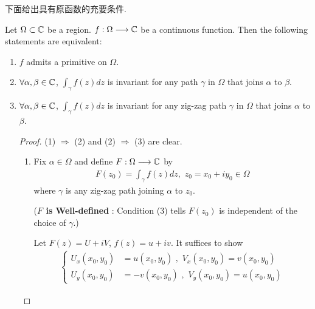 	\vspace{2em}
	下面给出具有原函数的充要条件.
	\begin{thm}
		Let $\Omega \subset \mathbb{C}$ be a region. $f : \Omega \longrightarrow \mathbb{C}$ be a continuous function. Then the following statements are equivalent:
		\begin{enumerate}
			\item[(1)]$f$ admits a primitive on $\Omega$.
			
			\item[(2)]$\forall \alpha , \beta \in \mathbb{C}$, $\int_{\gamma}{f(z) dz}$ is invariant for any path $\gamma$ in $\Omega$ that joins $\alpha$ to $\beta$.
			
			\item[(3)]$\forall \alpha , \beta \in \mathbb{C}$, $\int_{\gamma}{f(z) dz}$ is invariant for any zig-zag path $\gamma$ in $\Omega$ that joins $\alpha$ to $\beta$.
			
			\vspace{2em}
			\begin{proof}
				(1) $\Rightarrow$ (2) and (2) $\Rightarrow$ (3) are clear.
				\begin{enumerate}
					\item[(3) $\Rightarrow$ (1):]Fix $\alpha \in \Omega$ and define $F : \Omega \longrightarrow \mathbb{C}$ by 
					\begin{align}
						F(z_0) = \int_{\gamma}{f(z) dz} , \,\, z_0 = x_0 + i y_0 \in \Omega
					\end{align}
					where $\gamma$ is any zig-zag path joining $\alpha$ to $z_0$.
					\begin{center}
						(\textbf{$F$ is Well-defined} : Condition (3) tells $F(z_0)$ is independent of the choice of $\gamma$.)
					\end{center}
					
					\vspace{1.5em}
					Let $F(z) = U + i V$, $f(z) = u + i v$. It suffices to show
					\begin{align}
						\begin{cases}
							U_{x}(x_0 , y_0) &= u(x_0 , y_0) \,\, , \,\, V_{x}(x_0 , y_0) = v(x_0 , y_0) \\
							U_{y}(x_0 , y_0) &= -v(x_0 , y_0) \,\, , \,\, V_{y}(x_0 , y_0) = u(x_0 , y_0)
						\end{cases}
					\end{align}
					

\end{enumerate}
\end{proof}
\end{enumerate}
\end{thm}
